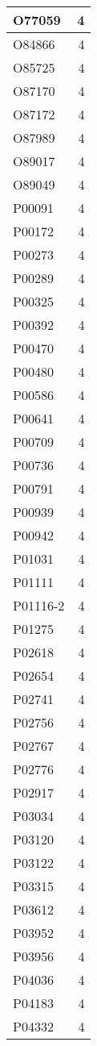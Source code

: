 \documentclass[
]{book}
\theoremstyle{definition}
\theoremstyle{definition}
\theoremstyle{definition}
\theoremstyle{definition}
\theoremstyle{remark}
\begin{document}
\begin{table}
\begin{tabular}{l|r}
\hline
O77059 & 4\\
\hline
O84866 & 4\\
\hline
O85725 & 4\\
\hline
O87170 & 4\\
\hline
O87172 & 4\\
\hline
O87989 & 4\\
\hline
O89017 & 4\\
\hline
O89049 & 4\\
\hline
P00091 & 4\\
\hline
P00172 & 4\\
\hline
P00273 & 4\\
\hline
P00289 & 4\\
\hline
P00325 & 4\\
\hline
P00392 & 4\\
\hline
P00470 & 4\\
\hline
P00480 & 4\\
\hline
P00586 & 4\\
\hline
P00641 & 4\\
\hline
P00709 & 4\\
\hline
P00736 & 4\\
\hline
P00791 & 4\\
\hline
P00939 & 4\\
\hline
P00942 & 4\\
\hline
P01031 & 4\\
\hline
P01111 & 4\\
\hline
P01116-2 & 4\\
\hline
P01275 & 4\\
\hline
P02618 & 4\\
\hline
P02654 & 4\\
\hline
P02741 & 4\\
\hline
P02756 & 4\\
\hline
P02767 & 4\\
\hline
P02776 & 4\\
\hline
P02917 & 4\\
\hline
P03034 & 4\\
\hline
P03120 & 4\\
\hline
P03122 & 4\\
\hline
P03315 & 4\\
\hline
P03612 & 4\\
\hline
P03952 & 4\\
\hline
P03956 & 4\\
\hline
P04036 & 4\\
\hline
P04183 & 4\\
\hline
P04332 & 4\\

\end{tabular}
\end{table}
\end{document}
